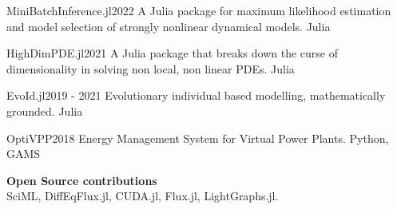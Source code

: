 %
%
%


\begin{projects}
	\project
	{MiniBatchInference.jl}{2022}
	{  }
	{A Julia package for maximum likelihood estimation and model selection of strongly nonlinear dynamical models.}
	{Julia}
	
	\project
	{HighDimPDE.jl}{2021}
	{  }
	{A Julia package that breaks down the curse of dimensionality in solving non local, non linear PDEs.}
	{Julia}
				
	\project
	{EvoId.jl}{2019 - 2021}
	{  }
	{Evolutionary individual based modelling, mathematically grounded.}
	{Julia}
	
    \project
	{OptiVPP}{2018}
	{}
	{Energy Management System for Virtual Power Plants.}
	{Python, GAMS}
	
	\textbf{Open Source contributions}\\
	SciML, DiffEqFlux.jl, CUDA.jl, Flux.jl, LightGraphs.jl.
\end{projects}